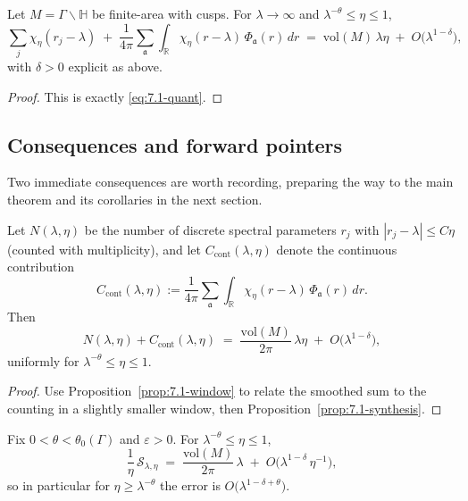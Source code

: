 \begin{proposition}\label{prop:7.1-synthesis}
Let $M=\Gamma\backslash\mathbb{H}$ be finite-area with cusps. For $\lambda\to\infty$ and $\lambda^{-\theta}\le \eta\le 1$,
\[
  \sum_j \chi_\eta(r_j-\lambda)
  \;+\; \frac{1}{4\pi}\sum_{\mathfrak{a}}\int_{\mathbb{R}}
        \chi_\eta(r-\lambda)\, \Phi_{\mathfrak{a}}(r)\, dr
  \;=\; \mathrm{vol}(M)\,\lambda\eta \;+\; O\!\big(\lambda^{1-\delta}\big),
\]
with $\delta>0$ explicit as above.
\end{proposition}

\begin{proof}
This is exactly \eqref{eq:7.1-quant}.
\end{proof}

\subsection{Consequences and forward pointers} \label{subsec:7.1-forward}

Two immediate consequences are worth recording, preparing the way to the main theorem and its corollaries in the next section.

\begin{corollary}\label{cor:7.1-count}
Let $N(\lambda,\eta)$ be the number of discrete spectral parameters $r_j$ with $|r_j-\lambda|\le C\eta$ (counted with multiplicity), and let $C_\mathrm{cont}(\lambda,\eta)$ denote the continuous contribution
\[
  C_\mathrm{cont}(\lambda,\eta)
  := \frac{1}{4\pi}\sum_{\mathfrak{a}}\int_{\mathbb{R}} \chi_\eta(r-\lambda)\, \Phi_{\mathfrak{a}}(r)\, dr.
\]
Then
\[
  N(\lambda,\eta) + C_\mathrm{cont}(\lambda,\eta)
  \;=\; \frac{\mathrm{vol}(M)}{2\pi}\,\lambda\eta \;+\; O\!\big(\lambda^{1-\delta}\big),
\]
uniformly for $\lambda^{-\theta}\le \eta\le 1$.
\end{corollary}

\begin{proof}
Use Proposition~\ref{prop:7.1-window} to relate the smoothed sum to the counting in a slightly smaller window, then Proposition~\ref{prop:7.1-synthesis}.
\end{proof}

\begin{corollary}\label{cor:7.1-density}
Fix $0<\theta<\theta_0(\Gamma)$ and $\varepsilon>0$. For $\lambda^{-\theta}\le \eta\le 1$,
\[
  \frac{1}{\eta}\,\mathcal{S}_{\lambda,\eta}
  \;=\; \frac{\mathrm{vol}(M)}{2\pi}\, \lambda \;+\; O\!\big(\lambda^{1-\delta}\,\eta^{-1}\big),
\]
so in particular for $\eta\ge \lambda^{-\theta}$ the error is $O\big(\lambda^{1-\delta+\theta}\big)$.
\end{corollary}

